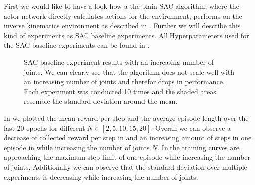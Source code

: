 First we would like to have a look how a the plain SAC algorithm, where the actor network directly calculates actions for the environment, performs on the inverse kinematics environment as described in . Further we will describe this kind of experiments as SAC baseline experiments. All Hyperparameters used for the SAC baseline experiments can be found in .
\begin{figure}[h]
    \begin{center}
        \hfill
    \end{center}
    \caption[SAC baseline experiment results]{SAC baseline experiment results with an increasing number of joints. We can clearly see that the algorithm does not scale well with an increasing number of joints and therefor drops in performance. Each experiment was conducted 10 times and the shaded areas resemble the standard deviation around the mean.}
    \label{fig:SAC_baseline}
\end{figure}

In  we plotted the mean reward per step and the average episode length over the last 20 epochs for different $N \in [2, 5, 10, 15, 20]$. Overall we can observe a decrease of collected reward per step in  and an increasing amount of steps in one episode in  while increasing the number of joints $N$. In  the training curves are approaching the maximum step limit of one episode while increasing the number of joints. Additionally we can observe that the standard deviation over multiple experiments is decreasing while increasing the number of joints.


